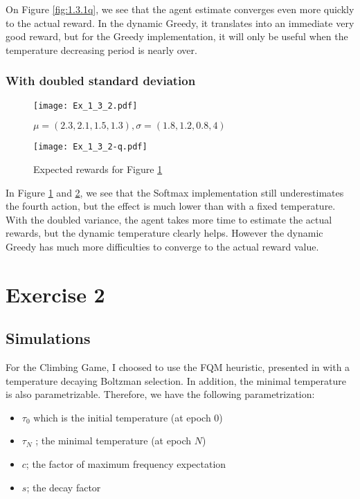 \documentclass[a4paper,11pt]{article}
\begin{document}
On Figure \ref{fig:1.3.1q}, we see that the agent estimate converges even more quickly to the actual reward. In the dynamic Greedy, it translates into an immediate very good reward, but for the Greedy implementation, it will only be useful when the temperature decreasing period is nearly over.

\subsubsection{With doubled standard deviation}
\begin{figure}[H]
  \center
  \texttt{[image: Ex\_1\_3\_2.pdf]}
  \caption{\label{fig:1.3.2} $\mu = (2.3, 2.1, 1.5, 1.3), \sigma = (1.8, 1.2, 0.8, 4)$}
\end{figure}

\begin{figure}[H]
  \center
  \texttt{[image: Ex\_1\_3\_2-q.pdf]}
  \caption{\label{fig:1.3.2q} Expected rewards for Figure \ref{fig:1.3.2}}
\end{figure}

In Figure \ref{fig:1.3.2} and \ref{fig:1.3.2q}, we see that the Softmax implementation still underestimates the fourth action, but the effect is much lower than with a fixed temperature. With the doubled variance, the agent takes more time to estimate the actual rewards, but the dynamic temperature clearly helps. However the dynamic Greedy has much more difficulties to converge to the actual reward value.

\section{Exercise 2}
\subsection{Simulations}
For the Climbing Game, I choosed to use the FQM heuristic, presented in \cite{Kapetanakis2005} with a temperature decaying Boltzman selection. In addition, the minimal temperature is also parametrizable. Therefore, we have the following parametrization:

\begin{itemize}
  \item $\tau_0$ which is the initial temperature (at epoch 0)
  \item $\tau_N$ ; the minimal temperature (at epoch $N$)
  \item $c$; the factor of maximum frequency expectation
  \item $s$; the decay factor
\end{itemize}
\end{document}
